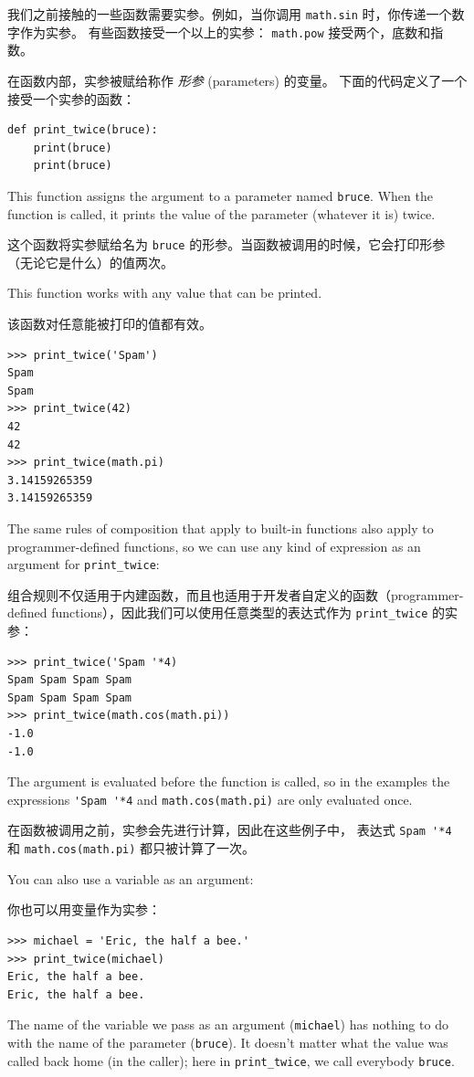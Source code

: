 我们之前接触的一些函数需要实参。例如，当你调用 \lstinline{math.sin} 时，你传递一个数字作为实参。
有些函数接受一个以上的实参： \lstinline{math.pow} 接受两个，底数和指数。

在函数内部，实参被赋给称作 \emph{形参} (parameters) 的变量。
下面的代码定义了一个接受一个实参的函数：

\begin{lstlisting}
def print_twice(bruce):
    print(bruce)
    print(bruce)
\end{lstlisting}
%
This function assigns the argument to a parameter
named {\tt bruce}.  When the function is called, it prints the value of
the parameter (whatever it is) twice.

这个函数将实参赋给名为 \lstinline{bruce} 的形参。当函数被调用的时候，它会打印形参（无论它是什么）的值两次。

This function works with any value that can be printed.

该函数对任意能被打印的值都有效。

\begin{lstlisting}
>>> print_twice('Spam')
Spam
Spam
>>> print_twice(42)
42
42
>>> print_twice(math.pi)
3.14159265359
3.14159265359
\end{lstlisting}

%
The same rules of composition that apply to built-in functions also
apply to programmer-defined functions, so we can use any kind of expression
as an argument for \verb"print_twice":

组合规则不仅适用于内建函数，而且也适用于开发者自定义的函数（programmer-defined functions），因此我们可以使用任意类型的表达式作为 \lstinline{print_twice} 的实参：
  
\begin{lstlisting}
>>> print_twice('Spam '*4)
Spam Spam Spam Spam
Spam Spam Spam Spam
>>> print_twice(math.cos(math.pi))
-1.0
-1.0
\end{lstlisting}
%
The argument is evaluated before the function is called, so
in the examples the expressions \verb"'Spam '*4" and
{\tt math.cos(math.pi)} are only evaluated once.

在函数被调用之前，实参会先进行计算，因此在这些例子中，
表达式 \lstinline{Spam '*4} 和 \lstinline{math.cos(math.pi)} 都只被计算了一次。

You can also use a variable as an argument:

你也可以用变量作为实参：

\begin{lstlisting}
>>> michael = 'Eric, the half a bee.'
>>> print_twice(michael)
Eric, the half a bee.
Eric, the half a bee.
\end{lstlisting}
%
The name of the variable we pass as an argument ({\tt michael}) has
nothing to do with the name of the parameter ({\tt bruce}).  It
doesn't matter what the value was called back home (in the caller);
here in \verb"print_twice", we call everybody {\tt bruce}.

